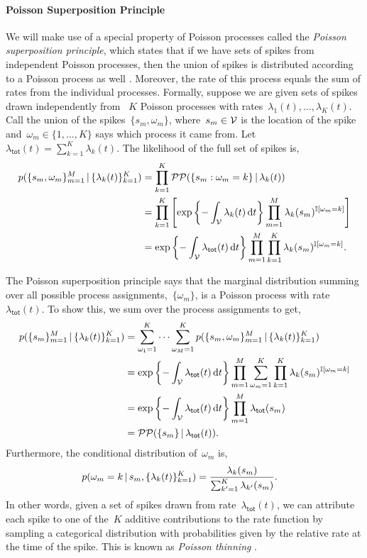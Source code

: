 \paragraph{Poisson Superposition Principle}
We will make use of a special property of Poisson processes called the
\emph{Poisson superposition principle}, which states that if we have 
sets of spikes from independent Poisson processes, then the union of spikes 
is distributed according to a Poisson process as well \citep{Kingman-1993}.
Moreover, the rate of this process equals the sum of 
rates from the individual processes. 
Formally, suppose we are given sets of spikes drawn independently
from ~$K$ Poisson processes with rates~${\lambda_1(t), \ldots,
  \lambda_K(t)}$.  Call the union of the spikes~${\{s_m,
  \omega_m\}}$, where~${s_m \in \mathcal{V}}$ is the location of the spike
and~${\omega_m \in \{1, \ldots, K\}}$ says which process it came
from. Let~${\lambda_{\mathsf{tot}}(t) = \sum_{k=1}^K \lambda_k(t)}$.
The likelihood of the full set of spikes is,
\begin{align*}
  p(\{s_m, \omega_m\}_{m=1}^M \,|\, \{\lambda_k(t)\}_{k=1}^K)
  &= \prod_{k=1}^K \mathcal{PP}(\{s_m: \omega_m=k\} \,|\, \lambda_k(t)) \\
  &= \prod_{k=1}^K \left[
    \exp\left\{-\int_{\mathcal{V}} \lambda_k(t) \, \mathrm{d}t\right\}
    \prod_{m=1}^M \lambda_k(s_m)^{\mathbb{I}[\omega_m = k]} \right] \\
  &= \exp\left\{-\int_{\mathcal{V}} \lambda_{\mathsf{tot}}(t) \, \mathrm{d}t\right\}
  \prod_{m=1}^M \prod_{k=1}^K \lambda_k(s_m)^{\mathbb{I}[\omega_m = k]}.
\end{align*}

The Poisson superposition principle says that the marginal distribution
summing over all possible process assignments,~$\{\omega_m\}$, is a Poisson
process with rate~$\lambda_{\mathsf{tot}}(t)$. To show this, we sum over
the process assignments to get,
\begin{align*}
  p(\{s_m\}_{m=1}^M \,|\, \{\lambda_k(t)\}_{k=1}^K)
  &= \sum_{\omega_1=1}^K \cdots \sum_{\omega_M=1}^K p(\{s_m, \omega_m\}_{m=1}^M \,|\, \{\lambda_k(t)\}_{k=1}^K) \\
  &= \exp\left\{-\int_{\mathcal{V}} \lambda_{\mathsf{tot}}(t) \, \mathrm{d}t\right\}
  \prod_{m=1}^M \sum_{\omega_m=1}^K \prod_{k=1}^K \lambda_k(s_m)^{\mathbb{I}[\omega_m = k]} \\
  &= \exp\left\{-\int_{\mathcal{V}} \lambda_{\mathsf{tot}}(t) \, \mathrm{d}t\right\}
  \prod_{m=1}^M \lambda_{\mathsf{tot}}(s_m) \\
  &= \mathcal{PP}(\{s_m\} \,|\, \lambda_{\mathsf{tot}}(t)).
\end{align*}
Furthermore, the conditional distribution of~$\omega_m$ is,
\begin{align*}
  p(\omega_m=k \,|\, s_m, \{\lambda_k(t)\}_{k=1}^K)
  &= \frac{\lambda_k(s_m)}{\sum_{k'=1}^K \lambda_{k'}(s_m)}.
\end{align*}
In other words, given a set of spikes drawn from rate~$\lambda_{\mathsf{tot}}(t)$,
we can attribute each spike to one of the~$K$ additive contributions
to the rate function by sampling a categorical distribution with probabilities
given by the relative rate at the time of the spike. This is known as
\emph{Poisson thinning} \citep{Kingman-1993}.

